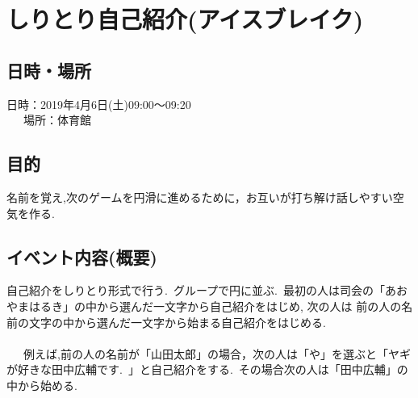 \section{しりとり自己紹介(アイスブレイク)}
\subsection{日時・場所}
日時：2019年4月6日(土)09:00〜09:20\\
\ \ \ 場所：体育館\\

\subsection{目的}
名前を覚え,次のゲームを円滑に進めるために，お互いが打ち解け話しやすい空気を作る.

\subsection{イベント内容(概要)}
自己紹介をしりとり形式で行う.\ グループで円に並ぶ.\ 最初の人は司会の「あおやまはるき」の中から選んだ一文字から自己紹介をはじめ, 次の人は
前の人の名前の文字の中から選んだ一文字から始まる自己紹介をはじめる. \\\\
\ \ \ 例えば,前の人の名前が「山田太郎」の場合，次の人は「や」を選ぶと「ヤギが好きな田中広輔です.\ 」と自己紹介をする.\ その場合次の人は「田中広輔」の中から始める.
